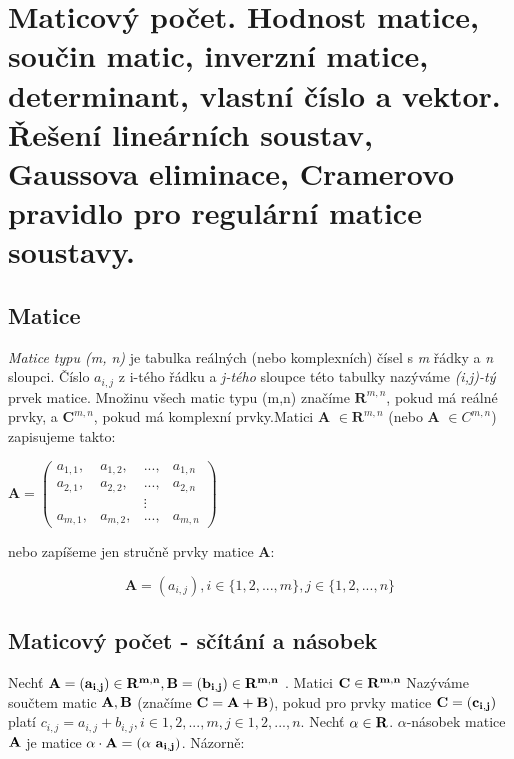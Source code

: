 \section[A7B01LAG - Matice]{Maticový počet. Hodnost matice, součin matic, inverzní matice, determinant, vlastní číslo a vektor. Řešení lineárních soustav, Gaussova eliminace, Cramerovo pravidlo pro regulární matice soustavy.}


\subsection*{Matice} \textit{Matice typu (m, n)} je tabulka reálných (nebo komplexních) čísel s \textit{m} řádky a \textit{n} sloupci. Číslo \textit{$a_{i,j}$} z i-tého řádku a \textit{j-tého} sloupce této tabulky nazýváme \textit{(i,j)-tý} prvek matice. Množinu všech matic typu (m,n) značíme $\textbf{R}^{m,n}$, pokud má reálné prvky, a $\textbf{C}^{m,n}$, pokud má komplexní prvky.Matici \textbf{A} $\in \textbf{R}^{m,n}$ (nebo \textbf{A} $\in C^{m,n}$) zapisujeme takto:
\begin{center}
$\textbf{A} = \begin{pmatrix}
  a_{1,1}, & a_{1,2}, & ..., & a_{1,n} \\
  a_{2,1}, & a_{2,2}, & ..., & a_{2,n} \\
  && \vdots & \\
  a_{m,1}, & a_{m,2}, & ..., & a_{m,n}
 \end{pmatrix}$
\end{center}

nebo zapíšeme jen stručně prvky matice \textbf{A}:

$$\textbf{A} = (a_{i,j}), i \in \{1,2,...,m\}, j \in \{1,2,...,n\}$$

\subsection*{Maticový počet - sčítání a násobek}
 Nechť $\bf A = (a_{i,j}) \in R^{m,n} , B = (b_{i,j}) \in R^{m,n}$ . Matici $\bf C \in R^{m,n}$ Nazýváme součtem matic $\bf A, B$ (značíme $\bf C = A + B$), pokud pro prvky matice $\bf C = (c_{i,j})$ platí $c_{i,j} = a_{i,j} + b_{i,j} , i \in {1,2,...,m},j \in {1,2,...,n}$. Nechť $\bf \alpha \in R$. $\alpha$-násobek matice $\bf A$ je matice $\bf \alpha \cdot A = (\alpha~a_{i,j})$. Názorně:

